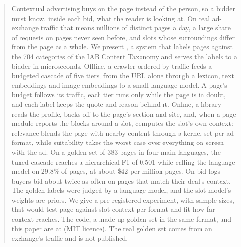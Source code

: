 \begin{abstract}
Contextual advertising buys on the page instead of the person, so a bidder must know, inside each bid, what the reader is looking at. On real ad-exchange traffic that means millions of distinct pages a day, a large share of requests on pages never seen before, and slots whose surroundings differ from the page as a whole. We present \sys{}, a system that labels pages against the 704 categories of the IAB Content Taxonomy and serves the labels to a bidder in microseconds. Offline, a crawler ordered by traffic feeds a budgeted cascade of five tiers, from the URL alone through a lexicon, text embeddings and image embeddings to a small language model. A page's budget follows its traffic, each tier runs only while the page is in doubt, and each label keeps the quote and reason behind it. Online, a library reads the profile, backs off to the page's section and site, and, when a page module reports the blocks around a slot, computes the slot's own context: relevance blends the page with nearby content through a kernel set per ad format, while suitability takes the worst case over everything on screen with the ad. On a golden set of 383 pages in four main languages, the tuned cascade reaches a hierarchical F1 of 0.501 while calling the language model on 29.8\% of pages, at about \$42 per million pages. On bid logs, buyers bid about twice as often on pages that match their deal's context. The golden labels were judged by a language model, and the slot model's weights are priors. We give a pre-registered experiment, with sample sizes, that would test page against slot context per format and fit how far context reaches. The code, a made-up golden set in the same format, and this paper are at \repo{} (MIT licence). The real golden set comes from an exchange's traffic and is not published.
\end{abstract}
